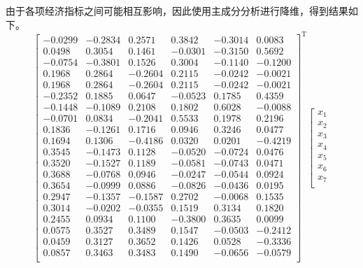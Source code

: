 \documentclass{cumcm}
\begin{document}
\begin{enumerate}
	由于各项经济指标之间可能相互影响，因此使用主成分分析进行降维，得到结果如下。
	\begin{equation}
		\left[
\begin{array}{cccccc}
-0.0299 & -0.2834 & 0.2571 & 0.3842 & -0.3014 & 0.0083\\
0.0498 & 0.3054 & 0.1461 & -0.0301 & -0.3150 & 0.5692\\
-0.0754 & -0.3801 &	0.1526 & 0.3004 & -0.1140 & -0.1200\\
0.1968 & 0.2864 & -0.2604 & 0.2115 & -0.0242 & -0.0021\\
0.1968 & 0.2864 & -0.2604 & 0.2115 & -0.0242 & -0.0021\\
-0.2352 & 0.1885 & 0.0647 & -0.0523 & 0.1785 & 0.4359\\
-0.1448 & -0.1089 & 0.2108 & 0.1802 & 0.6028 & -0.0088\\
-0.0701 & 0.0834 & -0.2041 & 0.5533 & 0.1978 & 0.2196\\
0.1836 & -0.1261 & 0.1716 & 0.0946 & 0.3246 & 0.0477\\
0.1694 & 0.1306 & -0.4186 & 0.0320 & 0.0201 & -0.4219\\
0.3545 & -0.1473 & 0.1128 & -0.0520 & -0.0724 & 0.0476\\
0.3520 & -0.1527 & 0.1189 & -0.0581 & -0.0743 & 0.0471\\
0.3688 & -0.0768 & 0.0946 & -0.0247 & -0.0544 & 0.0924\\
0.3654 & -0.0999 & 0.0886 & -0.0826 & -0.0436 & 0.0195\\
0.2947 & -0.1357 & -0.1587 & 0.2702 & -0.0068 & 0.1535\\
0.3014 & -0.0202 & -0.0355 & 0.1519 & 0.3134 & 0.1820\\
0.2455 & 0.0934 & 0.1100 & -0.3800 & 0.3635 & 0.0099\\
0.0575 & 0.3527 & 0.3489 & 0.1547 & -0.0503 & -0.2412\\
0.0459 & 0.3127 & 0.3652 & 0.1426 & 0.0528 & -0.3336\\
0.0857 & 0.3463 & 0.3483 & 0.1490 & -0.0656 & -0.0579\\
\end{array}
\right]^\mathrm{ T }
\left[
\begin{array}{c}
    x_{1} \\
	x_{2} \\
	x_{3} \\
	x_{4} \\
	x_{5} \\
	x_{6} \\
	x_{7} \\

\end{array}
\end{equation}
\end{enumerate}
\end{document}
